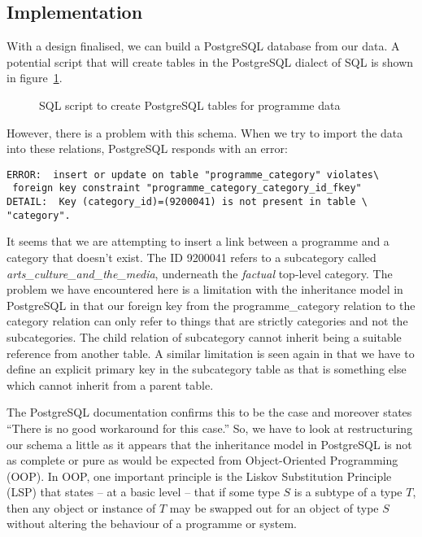 \documentclass[11pt,a4paper]{article}
\begin{document}
\subsection{Implementation}

With a design finalised, we can build a PostgreSQL database from
our data. A potential script that will create tables in the PostgreSQL
dialect of SQL is shown in figure~\ref{fig:create_table}.

\begin{figure}[p]
  
  \caption{SQL script to create PostgreSQL tables for programme data}
  \label{fig:create_table}
\end{figure}

However, there is a problem with this schema. When we try to import the
data into these relations, PostgreSQL responds with an error:

\begin{verbatim}
ERROR:  insert or update on table "programme_category" violates\
 foreign key constraint "programme_category_category_id_fkey"
DETAIL:  Key (category_id)=(9200041) is not present in table \
"category".
\end{verbatim}

It seems that we are attempting to insert a link between a programme and
a category that doesn't exist. The ID 9200041 refers to a subcategory called
\emph{arts\_culture\_and\_the\_media}, underneath the \emph{factual} top-level
category. The problem we have encountered here is a limitation with the
inheritance model in PostgreSQL in that our foreign key from the
programme\_category relation to the category relation can only refer to things
that are strictly categories and not the subcategories. The child relation
of subcategory cannot inherit being a suitable reference from another table.
A similar limitation is seen again in that we have to define an explicit
primary key in the subcategory table as that is something else which
cannot inherit from a parent table.

The PostgreSQL documentation \cite{postgres-docs} confirms this to be the
case and moreover states ``There is no good workaround for this case.'' So,
we have to look at restructuring our schema a little as it appears that
the inheritance model in PostgreSQL is not as complete or pure as would
be expected from Object-Oriented Programming (OOP). In OOP, one important
principle is the Liskov Substitution Principle (LSP) that states -- at
a basic level -- that if some type $S$ is a subtype of a type $T$, then
any object or instance of $T$ may be swapped out for an object of
type $S$ without altering the behaviour of a programme or system.
\end{document}
